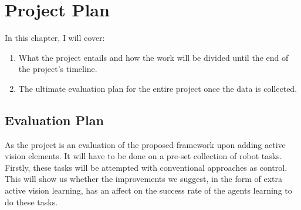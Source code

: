 \chapter{Project Plan}
  In this chapter, I will cover:
  \begin{enumerate}
    \item What the project entails and how the work will be divided until the end of the project's timeline.
    \item The ultimate evaluation plan for the entire project once the data is collected.
  \end{enumerate}

\section{Evaluation Plan}
As the project is an evaluation of the proposed framework upon adding active vision elements. It will have to be done on a pre-set collection of robot tasks. 
Firstly, these tasks will be attempted with conventional approaches as control. This will show us whether the improvements we suggest, in the form of extra active vision learning, has an affect on the success rate of the agents learning to do these tasks.